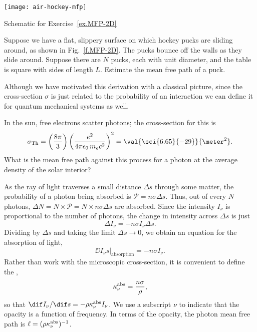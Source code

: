 \begin{marginfigure}[3\baselineskip]
    \texttt{[image: air-hockey-mfp]}
    \caption[Mean free path of a hockey puck]{\label{f.MFP-2D}Schematic for Exercise~\ref{ex.MFP-2D}}
\end{marginfigure}
\begin{exercisebox}\label{ex.MFP-2D}
    Suppose we have a flat, slippery surface on which hockey pucks are sliding around, as shown in Fig.~\ref{f.MFP-2D}. The pucks bounce off the walls as they slide around.  Suppose there are $N$ pucks, each with unit diameter, and the table is square with sides of length $L$.  Estimate the mean free path of a puck.
\end{exercisebox}

Although we have motivated this derivation with a classical picture, since the cross-section $\sigma$ is just related to the probability of an interaction we can define it for quantum mechanical systems as well.

\begin{exercisebox}\label{ex.MFP}
    In the sun, free electrons scatter photons; the cross-section for this is
    \[
    \sigma_{\mathrm{Th}} = \left(\frac{8\pi}{3}\right)\left(\frac{e^2}{4\pi\epsilon_{0}\,m_e c^2}\right)^2 = \val{\sci{6.65}{-29}}{\meter^2}.
    \]
    What is the mean free path against this process for a photon at the average density of the solar interior?
\end{exercisebox}

As the ray of light traverses a small distance $\Delta s$ through some matter, the probability of a photon being absorbed is $\mathcal{P} = n\sigma\Delta s$. Thus, out of every $N$ photons, $\Delta N = N \times\mathcal{P} = N\times n\sigma\Delta s$ are absorbed. Since the intensity $I_{\nu}$ is proportional to the number of photons, the change in intensity across $\Delta s$ is just
\[ \Delta I_{\nu} = -n\sigma I_{\nu}\Delta s. \]
Dividing by $\Delta s$ and taking the limit $\Delta s\to0$, we obtain an equation for the absorption of light,
\begin{equation}\label{e.absorption-microscopic}
\left.\DD{I_{\nu}}{s}\right|_{\mathrm{absorption}} = -n\sigma I_{\nu}.
\end{equation}
Rather than work with the microscopic cross-section, it is convenient to define the ,
\[
	\kappa_\nu^{\mathrm{abs}} = \frac{n\sigma}{\rho},
\]
so that $\dif I_{\nu}/\dif s = -\rho\kapabs I_{\nu}$. We use a subscript $\nu$ to indicate that the opacity is a function of frequency. In terms of the opacity, the photon mean free path is $\ell = (\rho\kappa_\nu^{\mathrm{abs}})^{-1}$.

